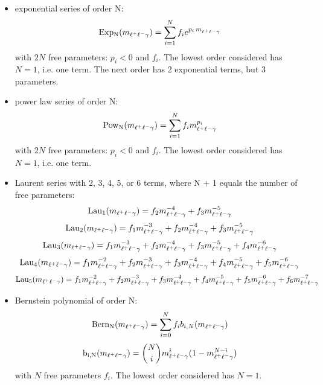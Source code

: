 \begin{itemize}
	\item exponential series of order N:
	\begin{equation}
        \mathrm{Exp_{N}}(m_{\ell^{+}\ell^{-}\gamma}) = \sum\limits_{i=1}^{N}f_ie^{p_i\, m_{\ell^{+}\ell^{-}\gamma}}
	\end{equation}
	with $2N$ free parameters: $p_i < 0$ and $f_i$.
	The lowest order considered has $N=1$, i.e. one term.
	The next order has 2 exponential terms, but 3 parameters.	

	\item power law series of order N:
	\begin{equation}
        \mathrm{Pow_{N}}(m_{\ell^{+}\ell^{-}\gamma}) = \sum\limits_{i=1}^{N}f_im_{\ell^{+}\ell^{-}\gamma}^{p_i}
	\end{equation}
	with $2N$ free parameters: $p_i < 0$ and $f_i$.
	The lowest order considered has $N=1$, i.e. one term.
	
	\item Laurent series with 2, 3, 4, 5, or 6 terms, where N + 1 equals the number of free parameters:
	\begin{equation}
        \mathrm{Lau_{1}}(m_{\ell^{+}\ell^{-}\gamma}) = f_2m_{\ell^{+}\ell^{-}\gamma}^{-4}+f_3m_{\ell^{+}\ell^{-}\gamma}^{-5}
	\end{equation}
	\begin{equation}
        \mathrm{Lau_{2}}(m_{\ell^{+}\ell^{-}\gamma}) = f_1m_{\ell^{+}\ell^{-}\gamma}^{-3}+f_2m_{\ell^{+}\ell^{-}\gamma}^{-4}+f_3m_{\ell^{+}\ell^{-}\gamma}^{-5}
	\end{equation}
	\begin{equation}
        \mathrm{Lau_{3}}(m_{\ell^{+}\ell^{-}\gamma}) = f_1m_{\ell^{+}\ell^{-}\gamma}^{-3}+f_2m_{\ell^{+}\ell^{-}\gamma}^{-4}+f_3m_{\ell^{+}\ell^{-}\gamma}^{-5}+f_4m_{\ell^{+}\ell^{-}\gamma}^{-6}
	\end{equation}
	\begin{equation}
        \mathrm{Lau_{4}}(m_{\ell^{+}\ell^{-}\gamma}) = f_1m_{\ell^{+}\ell^{-}\gamma}^{-2}+f_2m_{\ell^{+}\ell^{-}\gamma}^{-3}+f_3m_{\ell^{+}\ell^{-}\gamma}^{-4}+f_4m_{\ell^{+}\ell^{-}\gamma}^{-5}+f_5m_{\ell^{+}\ell^{-}\gamma}^{-6}
	\end{equation}
	\begin{equation}
        \mathrm{Lau_{5}}(m_{\ell^{+}\ell^{-}\gamma}) = f_1m_{\ell^{+}\ell^{-}\gamma}^{-2}+f_2m_{\ell^{+}\ell^{-}\gamma}^{-3}+f_3m_{\ell^{+}\ell^{-}\gamma}^{-4}+f_4m_{\ell^{+}\ell^{-}\gamma}^{-5}+f_5m_{\ell^{+}\ell^{-}\gamma}^{-6}+f_6m_{\ell^{+}\ell^{-}\gamma}^{-7}
	\end{equation}
	
	\item Bernstein polynomial of order N:
    \begin{equation}
        \mathrm{Bern_{N}}(m_{\ell^{+}\ell^{-}\gamma}) = \sum\limits_{i=0}^{N}f_{i}b_{i,N}(m_{\ell^{+}\ell^{-}\gamma})
    \end{equation}
    \begin{equation}
        \mathrm{b_{i,N}}(m_{\ell^{+}\ell^{-}\gamma}) = \binom{N}{i}m_{\ell^{+}\ell^{-}\gamma}^{i}(1 - m_{\ell^{+}\ell^{-}\gamma}^{N-i})
    \end{equation}
    with $N$ free parameters $f_{i}$. The lowest order considered has $N=1$.
\end{itemize}

